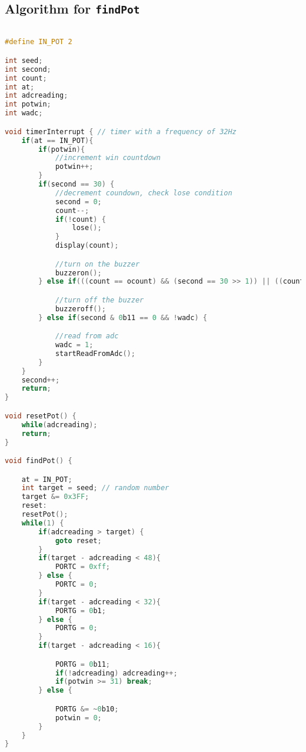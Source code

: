 \documentclass[a4paper]{article}
\begin{document}
\subsection{Algorithm for \texttt{findPot}}
\begin{lstlisting}[language=C]

#define IN_POT 2

int seed;
int second;
int count;
int at;
int adcreading;
int potwin;
int wadc;

void timerInterrupt { // timer with a frequency of 32Hz
	if(at == IN_POT){
		if(potwin){
			//increment win countdown
			potwin++;
		}
		if(second == 30) {
			//decrement coundown, check lose condition
			second = 0;
			count--;
			if(!count) {
				lose();
			}
			display(count);

			//turn on the buzzer
			buzzeron();
		} else if(((count == ocount) && (second == 30 >> 1)) || ((count != ocount) && (second == 30 >> 2))) {

			//turn off the buzzer
			buzzeroff();				
		} else if(second & 0b11 == 0 && !wadc) {

			//read from adc
			wadc = 1;
			startReadFromAdc();
		}
	}
	second++;
	return;
}

void resetPot() {
	while(adcreading);
	return;
}

void findPot() {

	at = IN_POT;
	int target = seed; // random number
	target &= 0x3FF;
	reset:
	resetPot();
	while(1) {
		if(adcreading > target) {
			goto reset;
		}
		if(target - adcreading < 48){
			PORTC = 0xff;
		} else {
			PORTC = 0;
		}
		if(target - adcreading < 32){
			PORTG = 0b1;
		} else {
			PORTG = 0;
		}
		if(target - adcreading < 16){

			PORTG = 0b11;
			if(!adcreading) adcreading++;
			if(potwin >= 31) break;
		} else {

			PORTG &= ~0b10;
			potwin = 0;
		}
	}
}
\end{lstlisting}
\end{document}
